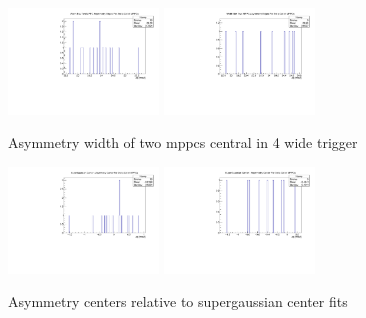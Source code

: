 \begin{figure}[H]
\centering
\includegraphics[width=4cm]{asymmetryplots/apxwid2.pdf}
\includegraphics[width=4cm]{asymmetryplots/apxwid3.pdf}
\caption{Asymmetry width of two mppcs central in 4 wide trigger}
\label{fig:asympwids} 
\end{figure}
\begin{figure}[H]
\centering
\includegraphics[width=4cm]{asymmetryplots/ap-sgp2.pdf}
\includegraphics[width=4cm]{asymmetryplots/ap-sgp3.pdf}
\caption{Asymmetry centers relative to supergaussian center fits}
\label{fig:asympcentdiff} 
\end{figure}
